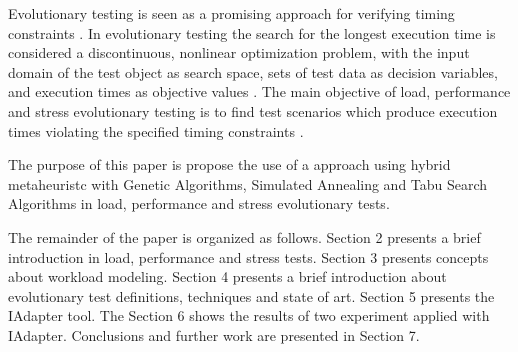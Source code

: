 Evolutionary testing is seen as a promising approach for verifying timing constraints \cite{Afzal2009a}. In evolutionary testing the search for the longest execution time is considered a discontinuous, nonlinear optimization problem, with the input domain of the test object as search space, sets of test data as decision variables, and execution times as objective values \cite{Stations}. The main objective of load, performance and stress evolutionary testing is to find test scenarios which produce execution times violating the specified timing constraints \cite{Sullivan}. 

%
%
%
The purpose of this paper is propose the use of a approach using  hybrid metaheuristc   with  Genetic Algorithms, Simulated Annealing and Tabu Search Algorithms  in load, performance and stress evolutionary tests.

The remainder of the paper is organized as follows. Section 2 presents a brief introduction in load, performance and stress tests. Section 3 presents concepts about workload modeling. Section 4 presents a brief introduction about evolutionary test definitions, techniques and state of art. Section 5 presents the IAdapter tool. The Section 6 shows the results of two experiment applied with IAdapter. Conclusions and further work are presented in Section 7.